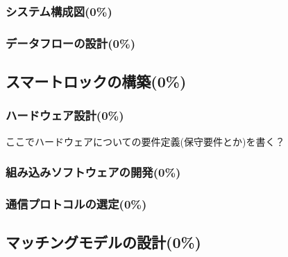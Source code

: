       \subsubsection{システム構成図(0\%)}
        \label{sec:システム構成図}
          \par
          
      \subsubsection{データフローの設計(0\%)}
        \label{sec:データフローの設計}
          \par  
  
  \subsection{スマートロックの構築(0\%)}
    \label{sec:スマートロックの構築}
      \par 
      
      \subsubsection{ハードウェア設計(0\%)}
        \label{sec:ハードウェア設計}
          \par ここでハードウェアについての要件定義(保守要件とか)を書く？
          
      \subsubsection{組み込みソフトウェアの開発(0\%)}
        \label{sec:組み込みソフトウェアの開発}
          \par
          
      \subsubsection{通信プロトコルの選定(0\%)}
        \label{sec:通信プロトコルの選定}
          \par
          
  \subsection{マッチングモデルの設計(0\%)}
    \label{sec:マッチングモデルの設計}
      \par

